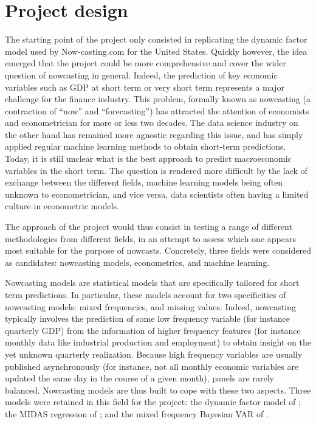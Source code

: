 \section{Project design}
\label{chapter2_section2}

The starting point of the project only consisted in replicating the dynamic factor model used by Now-casting.com for the United States. Quickly however, the idea emerged that the project could be more comprehensive and cover the wider question of nowcasting in general. Indeed, the prediction of key economic variables such as GDP at short term or very short term represents a major challenge for the finance industry. This problem, formally known as nowcasting (a contraction of ``now'' and ``forecasting'') has attracted the attention of economists and econometrician for more or less two decades. The data science industry on the other hand has remained more agnostic regarding this issue, and has simply applied regular machine learning methods to obtain short-term predictions. Today, it is still unclear what is the best approach to predict macroeconomic variables in the short term. The question is rendered more difficult by the lack of exchange between the different fields, machine learning models being often unknown to econometrician, and vice versa, data scientists often having a limited culture in econometric models.

The approach of the project would thus consist in testing a range of different methodologies from different fields, in an attempt to assess which one appears most suitable for the purpose of nowcasts. Concretely, three fields were considered as candidates: nowcasting models, econometrics, and machine learning.

Nowcasting models are statistical models that are specifically tailored for short term predictions. In particular, these models account for two specificities of nowcasting models: mixed frequencies, and missing values. Indeed, nowcasting typically involves the prediction of some low frequency variable (for instance quarterly GDP) from the information of higher frequency features (for instance monthly data like industrial production and employment) to obtain insight on the yet unknown quarterly realization. Because high frequency variables are usually published asynchronously (for instance, not all monthly economic variables are updated the same day in the course of a given month), panels are rarely balanced. Nowcasting models are thus built to cope with these two aspects. Three models were retained in this field for the project: the dynamic factor model of \cite{Giannone2008}; the MIDAS regression of \cite{Ghysels2004}; and the mixed frequency Bayesian VAR of \cite{Schorfheide2015}.

